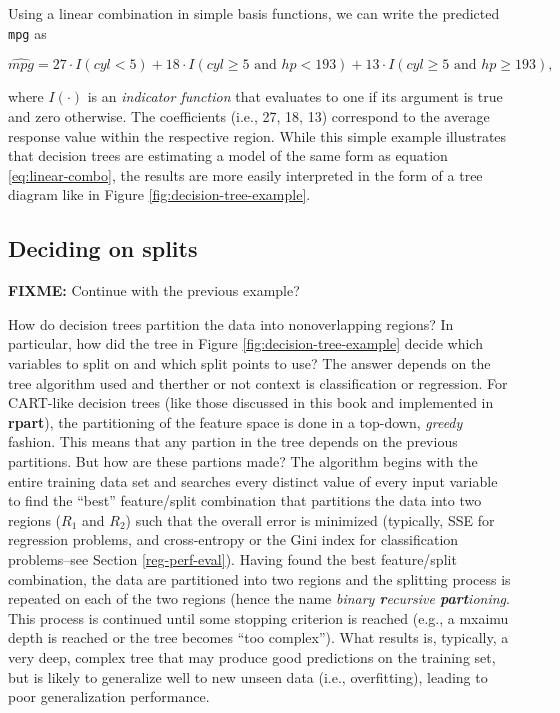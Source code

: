 \documentclass[]{book}
\theoremstyle{definition}
\theoremstyle{definition}
\theoremstyle{definition}
\theoremstyle{remark}
\begin{document}
Using a linear combination in simple basis functions, we can write the
predicted \texttt{mpg} as

\[
\widehat{mpg} = 27 \cdot I\left(cyl < 5\right) + 18 \cdot I\left(cyl \ge 5 \text{ and } hp < 193 \right) + 13 \cdot I\left(cyl \ge 5 \text{ and } hp \ge 193\right),
\]

where \(I\left(\cdot\right)\) is an \emph{indicator function} that
evaluates to one if its argument is true and zero otherwise. The
coefficients (i.e., 27, 18, 13) correspond to the average response value
within the respective region. While this simple example illustrates that
decision trees are estimating a model of the same form as equation
\eqref{eq:linear-combo}, the results are more easily interpreted in the
form of a tree diagram like in Figure \ref{fig:decision-tree-example}.

\hypertarget{deciding-on-splits}{%
\subsection{Deciding on splits}\label{deciding-on-splits}}

\textbf{FIXME:} Continue with the previous example?

How do decision trees partition the data into nonoverlapping regions? In
particular, how did the tree in Figure \ref{fig:decision-tree-example}
decide which variables to split on and which split points to use? The
answer depends on the tree algorithm used and therther or not context is
classification or regression. For CART-like decision trees (like those
discussed in this book and implemented in \textbf{rpart}), the
partitioning of the feature space is done in a top-down, \emph{greedy}
fashion. This means that any partion in the tree depends on the previous
partitions. But how are these partions made? The algorithm begins with
the entire training data set and searches every distinct value of every
input variable to find the ``best'' feature/split combination that
partitions the data into two regions (\(R_1\) and \(R_2\)) such that the
overall error is minimized (typically, SSE for regression problems, and
cross-entropy or the Gini index for classification problems--see Section
\ref{reg-perf-eval}). Having found the best feature/split combination,
the data are partitioned into two regions and the splitting process is
repeated on each of the two regions (hence the name \emph{binary
\textbf{r}ecursive \textbf{part}ioning}. This process is continued until
some stopping criterion is reached (e.g., a mxaimu depth is reached or
the tree becomes ``too complex''). What results is, typically, a very
deep, complex tree that may produce good predictions on the training
set, but is likely to generalize well to new unseen data (i.e.,
overfitting), leading to poor generalization performance.
\end{document}
